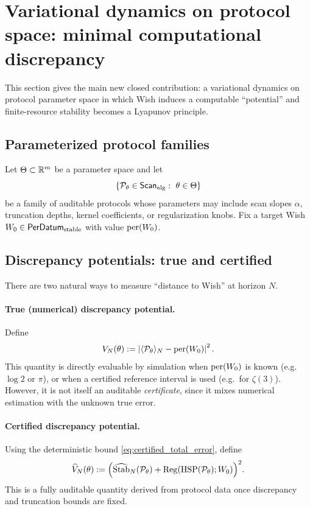 
\section{Variational dynamics on protocol space: minimal computational discrepancy}
\label{sec:variational_dynamics}

This section gives the main new closed contribution: a variational dynamics on protocol parameter space in which Wish induces a computable ``potential'' and finite-resource stability becomes a Lyapunov principle.

\subsection{Parameterized protocol families}
\label{sec:param_protocol_families}

Let $\Theta\subset\mathbb{R}^m$ be a parameter space and let
\[
\{\mathcal{P}_\theta\in\ScanAlg:\ \theta\in\Theta\}
\]
be a family of auditable protocols whose parameters may include scan slopes $\alpha$, truncation depths, kernel coefficients, or regularization knobs.
Fix a target Wish $W_0\in\mathsf{PerDatum}_{\mathrm{stable}}$ with value $\mathrm{per}(W_0)$.

\subsection{Discrepancy potentials: true and certified}
\label{sec:potentials}

There are two natural ways to measure ``distance to Wish'' at horizon $N$.

\paragraph{True (numerical) discrepancy potential.}
Define
\begin{equation}
\label{eq:true_potential}
V_N(\theta):=\left|\langle \mathcal{P}_\theta \rangle_N-\mathrm{per}(W_0)\right|^2.
\end{equation}
This quantity is directly evaluable by simulation when $\mathrm{per}(W_0)$ is known (e.g.\ $\log 2$ or $\pi$), or when a certified reference interval is used (e.g.\ for $\zeta(3)$).
However, it is not itself an auditable \emph{certificate}, since it mixes numerical estimation with the unknown true error.

\paragraph{Certified discrepancy potential.}
Using the deterministic bound \eqref{eq:certified_total_error}, define
\begin{equation}
\label{eq:cert_potential}
\widehat V_N(\theta):=\Big(\widehat{\mathrm{Stab}}_N(\mathcal{P}_\theta)+\mathrm{Reg}(\mathrm{HSP}(\mathcal{P}_\theta);W_0)\Big)^2.
\end{equation}
This is a fully auditable quantity derived from protocol data once discrepancy and truncation bounds are fixed.

